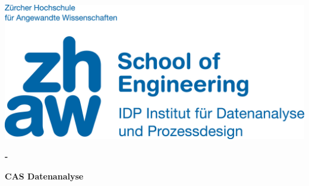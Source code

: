 \noindent
\begin{minipage}[t]{0.4\textwidth} 
\includegraphics[width=\linewidth]{logo.jpg}
\end{minipage}%
\hfill%
\begin{minipage}[t]{0.4\textwidth}\raggedleft
\textbf{\large \the\year-\the\month }
\end{minipage}

\begin{center}
 \textbf{\large CAS Datenanalyse} \\
 \vspace{0.3cm}
\end{center}
